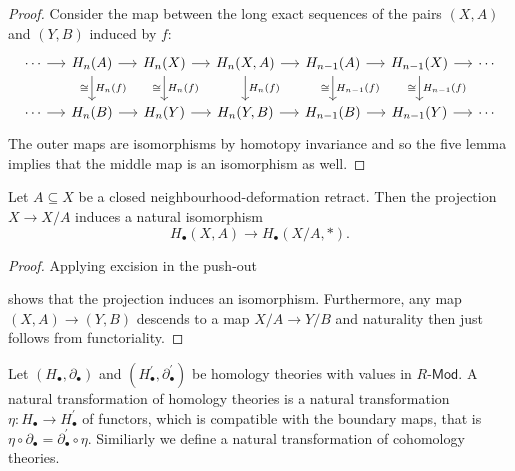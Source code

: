 \begin{proof}
    Consider the map between the long exact sequences of the pairs $(X,A)$ and $(Y,B)$ induced by $f$: 
    \[\begin{tikzcd}[column sep = 1.3em]
	\cdots & {H_n(A)} & {H_n(X)} & {H_n(X,A)} & {H_{n-1}(A)} & {H_{n-1}(X)} & \cdots \\
	\cdots & {H_n(B)} & {H_n(Y)} & {H_n(Y,B)} & {H_{n-1}(B)} & {H_{n-1}(Y)} & \cdots
	\arrow[from=1-1, to=1-2]
	\arrow[from=1-2, to=1-3]
	\arrow["{H_n(f)}", "\cong"', from=1-2, to=2-2]
	\arrow[from=1-3, to=1-4]
	\arrow["{H_n(f)}", "\cong"', from=1-3, to=2-3]
	\arrow[from=1-4, to=1-5]
	\arrow["{H_n(f)}", from=1-4, to=2-4]
	\arrow[from=1-5, to=1-6]
	\arrow["{H_{n-1}(f)}", "\cong"', from=1-5, to=2-5]
	\arrow[from=1-6, to=1-7]
	\arrow["{H_{n-1}(f)}", "\cong"', from=1-6, to=2-6]
	\arrow[from=2-1, to=2-2]
	\arrow[from=2-2, to=2-3]
	\arrow[from=2-3, to=2-4]
	\arrow[from=2-4, to=2-5]
	\arrow[from=2-5, to=2-6]
	\arrow[from=2-6, to=2-7]
\end{tikzcd}\]
The outer maps are isomorphisms by homotopy invariance and so the five lemma implies that the middle map is an isomorphism as well.
\end{proof}

\begin{lemma}
    Let $A \subseteq X$ be a closed neighbourhood-deformation retract. Then the projection $X \to X/A$ induces a natural isomorphism $$H_\bullet(X,A) \to H_\bullet(X/A,\ast).$$
\end{lemma}
\begin{proof}
    Applying excision in the push-out
    \begin{center}
    \end{center}
    shows that the projection induces an isomorphism. Furthermore, any map $(X,A) \to (Y,B)$ descends to a map $X/A \to Y/B$ and naturality then just follows from functoriality. 
\end{proof}

\begin{definition}
    Let $(H_\bullet,\partial_\bullet)$ and $(H_\bullet^\prime,\partial_\bullet^\prime)$ be homology theories with values in $R$-$\mathsf{Mod}$. A natural transformation of homology theories is a natural transformation $\eta \colon H_\bullet \to H_\bullet^\prime$ of functors, which is compatible with the boundary maps, that is $\eta \circ \partial_\bullet = \partial_\bullet^\prime \circ \eta$. Similiarly we define a natural transformation of cohomology theories.
\end{definition}

